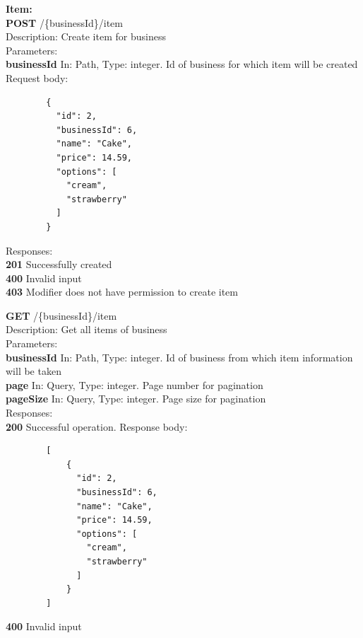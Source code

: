 \documentclass[11pt,a4paper,pdftex]{article}
\begin{document}
\textbf{Item:}\\
\hspace*{1em}\textbf{POST} /\{businessId\}/item\\
\hspace*{2em}Description: Create item for business\\
\hspace*{2em}Parameters:\\
\hspace*{3em}\textbf{businessId} In: Path, Type: integer. Id of business for which item will be created\\
\hspace*{2em}Request body:
\begin{verbatim}
        {
          "id": 2,
          "businessId": 6,
          "name": "Cake",
          "price": 14.59,
          "options": [
            "cream",
            "strawberry"
          ]
        }
\end{verbatim}
\hspace*{2em}Responses:\\
\hspace*{3em}\textbf{201} Successfully created\\
\hspace*{3em}\textbf{400} Invalid input\\
\hspace*{3em}\textbf{403} Modifier does not have permission to create item

\hspace*{1em}\textbf{GET} /\{businessId\}/item\\
\hspace*{2em}Description: Get all items of business\\
\hspace*{2em}Parameters:\\
\hspace*{3em}\textbf{businessId} In: Path, Type: integer. Id of business from which item information will be taken\\
\hspace*{3em}\textbf{page} In: Query, Type: integer. Page number for pagination\\
\hspace*{3em}\textbf{pageSize} In: Query, Type: integer. Page size for pagination\\
\hspace*{2em}Responses:\\
\hspace*{3em}\textbf{200} Successful operation. Response body:
\begin{verbatim}
        [
            {
              "id": 2,
              "businessId": 6,
              "name": "Cake",
              "price": 14.59,
              "options": [
                "cream",
                "strawberry"
              ]
            }
        ]
\end{verbatim}
\hspace*{3em}\textbf{400} Invalid input
\end{document}
